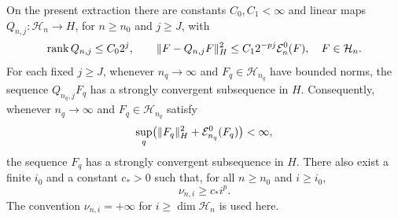 \begin{lemma}
\label{lem:energy-compactness}
On the present extraction there are constants \(C_0,C_1<\infty\) and
linear maps \(Q_{n,j}:\mathcal H_n\to H\), for \(n\ge n_0\) and \(j\ge J\), with
\begin{equation}\label{eq:finite-rank-approximation}
 \operatorname{rank} Q_{n,j}\le C_0 2^j,\qquad
 \lVert F-Q_{n,j}F\rVert_H^2
 \le C_1 2^{-pj}\mathcal E_n^0(F),\quad F\in \mathcal H_n.
\end{equation}
For each fixed \(j\ge J\), whenever \(n_q\to\infty\) and
\(F_q\in\mathcal H_{n_q}\) have bounded norms, the sequence
\(Q_{n_q,j}F_q\) has a strongly convergent subsequence in \(H\).
Consequently, whenever \(n_q\to\infty\) and \(F_q\in\mathcal H_{n_q}\) satisfy
\[
 \sup_q\bigl(\lVert F_q\rVert_H^2+\mathcal E_{n_q}^0(F_q)\bigr)<\infty,
\]
the sequence \(F_q\) has a strongly convergent subsequence in \(H\).
There also exist a finite
\(i_0\) and a constant \(c_*>0\) such that, for all \(n\ge n_0\) and
\(i\ge i_0\),
\begin{equation}\label{eq:raw-eigenvalue-tail}
 \nu_{n,i}\ge c_* i^p.
\end{equation}
The convention \(\nu_{n,i}=+\infty\) for \(i\ge\dim \mathcal H_n\) is used here.
\end{lemma}

